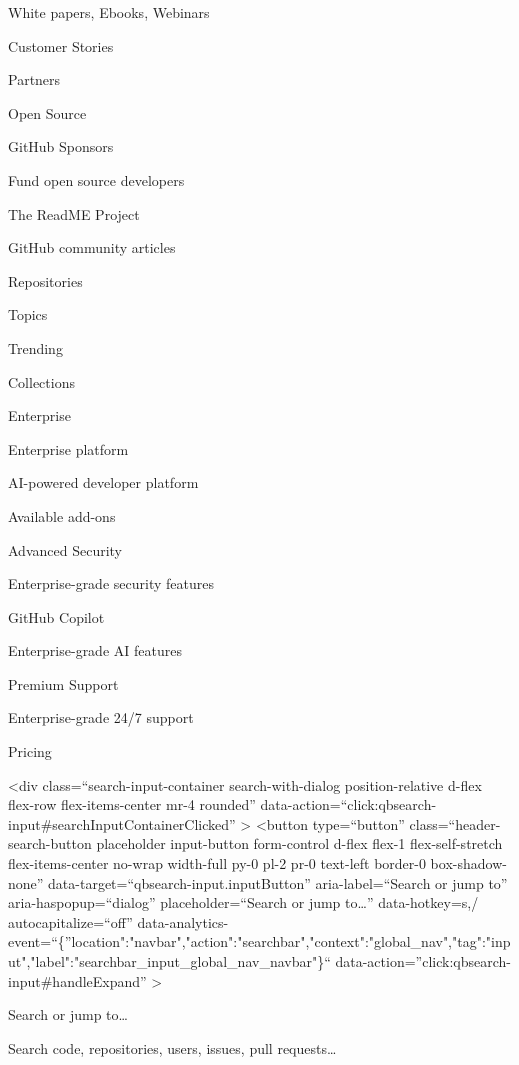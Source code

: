 \documentclass[
  letterpaper,
]{book}
\begin{document}
White papers, Ebooks, Webinars

Customer Stories

Partners

Open Source

GitHub Sponsors

Fund open source developers

The ReadME Project

GitHub community articles

\label{open-source-repositories-heading}{Repositories}

Topics

Trending

Collections

Enterprise

Enterprise platform

AI-powered developer platform

\label{enterprise-available-add-ons-heading}{Available
add-ons}

Advanced Security

Enterprise-grade security features

GitHub Copilot

Enterprise-grade AI features

Premium Support

Enterprise-grade 24/7 support

Pricing

\textless div class=``search-input-container search-with-dialog
position-relative d-flex flex-row flex-items-center mr-4 rounded''
data-action=``click:qbsearch-input\#searchInputContainerClicked''
\textgreater{} \textless button type=``button''
class=``header-search-button placeholder input-button form-control
d-flex flex-1 flex-self-stretch flex-items-center no-wrap width-full
py-0 pl-2 pr-0 text-left border-0 box-shadow-none''
data-target=``qbsearch-input.inputButton'' aria-label=``Search or jump
to'' aria-haspopup=``dialog'' placeholder=``Search or jump
to\ldots{}'' data-hotkey=s,/ autocapitalize=``off''
data-analytics-event=``\{''location":"navbar","action":"searchbar","context":"global\_nav","tag":"input","label":"searchbar\_input\_global\_nav\_navbar"\}``
data-action=''click:qbsearch-input\#handleExpand'' \textgreater{}

{Search or jump to\ldots{}}

Search code, repositories, users, issues, pull requests\ldots{}
\end{document}
